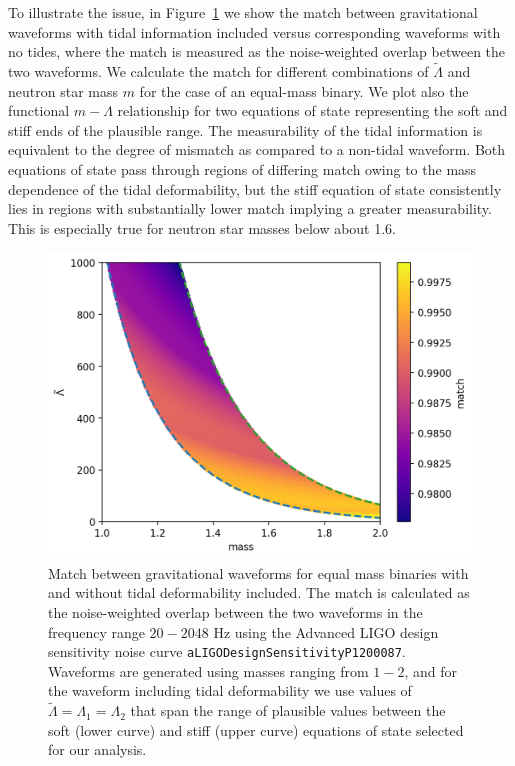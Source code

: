 To illustrate the issue, in Figure~\ref{fig:tidal_phase} we show the match between gravitational waveforms with tidal information included versus corresponding waveforms with no tides, where the match is measured as the noise-weighted overlap between the two waveforms. We calculate the match for different combinations of $\tilde\Lambda$ and neutron star mass $m$ for the case of an equal-mass binary. We plot also the functional $m-\Lambda$ relationship for two equations of state representing the soft and stiff ends of the plausible range. The measurability of the tidal information is equivalent to the degree of mismatch as compared to a non-tidal waveform. Both equations of state pass through regions of differing match owing to the mass dependence of the tidal deformability, but the stiff equation of state consistently lies in regions with substantially lower match implying a greater measurability. This is especially true for neutron star masses below about 1.6\msun.

\begin{figure}[b]
\includegraphics[width=\textwidth]{Figures/eos-meas/eos_match.png}
\caption{Match between gravitational waveforms for equal mass binaries with and without tidal deformability included. The match is calculated as the noise-weighted overlap between the two waveforms in the frequency range $20-2048$ Hz using the Advanced LIGO design sensitivity noise curve \texttt{aLIGODesignSensitivityP1200087}. Waveforms are generated using masses ranging from $1-2$\msun, and for the waveform including tidal deformability we use values of $\tilde\Lambda=\Lambda_{1}=\Lambda_{2}$ that span the range of plausible values between the soft (lower curve) and stiff (upper curve) equations of state selected for our analysis.}
\label{fig:tidal_phase}
\end{figure}

